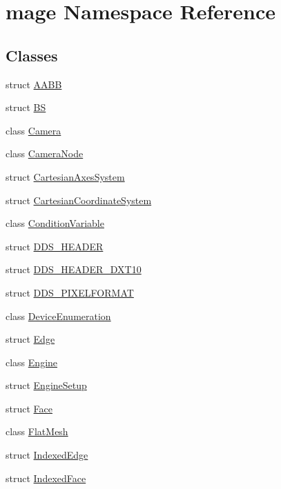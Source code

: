 \hypertarget{namespacemage}{}\section{mage Namespace Reference}
\label{namespacemage}
\subsection*{Classes}
\begin{DoxyCompactItemize}
\item 
struct \hyperlink{structmage_1_1_a_a_b_b}{A\+A\+BB}
\item 
struct \hyperlink{structmage_1_1_b_s}{BS}
\item 
class \hyperlink{classmage_1_1_camera}{Camera}
\item 
class \hyperlink{classmage_1_1_camera_node}{Camera\+Node}
\item 
struct \hyperlink{structmage_1_1_cartesian_axes_system}{Cartesian\+Axes\+System}
\item 
struct \hyperlink{structmage_1_1_cartesian_coordinate_system}{Cartesian\+Coordinate\+System}
\item 
class \hyperlink{classmage_1_1_condition_variable}{Condition\+Variable}
\item 
struct \hyperlink{structmage_1_1_d_d_s___h_e_a_d_e_r}{D\+D\+S\+\_\+\+H\+E\+A\+D\+ER}
\item 
struct \hyperlink{structmage_1_1_d_d_s___h_e_a_d_e_r___d_x_t10}{D\+D\+S\+\_\+\+H\+E\+A\+D\+E\+R\+\_\+\+D\+X\+T10}
\item 
struct \hyperlink{structmage_1_1_d_d_s___p_i_x_e_l_f_o_r_m_a_t}{D\+D\+S\+\_\+\+P\+I\+X\+E\+L\+F\+O\+R\+M\+AT}
\item 
class \hyperlink{classmage_1_1_device_enumeration}{Device\+Enumeration}
\item 
struct \hyperlink{structmage_1_1_edge}{Edge}
\item 
class \hyperlink{classmage_1_1_engine}{Engine}
\item 
struct \hyperlink{structmage_1_1_engine_setup}{Engine\+Setup}
\item 
struct \hyperlink{structmage_1_1_face}{Face}
\item 
class \hyperlink{classmage_1_1_flat_mesh}{Flat\+Mesh}
\item 
struct \hyperlink{structmage_1_1_indexed_edge}{Indexed\+Edge}
\item 
struct \hyperlink{structmage_1_1_indexed_face}{Indexed\+Face}
\item 

\end{DoxyCompactItemize}
